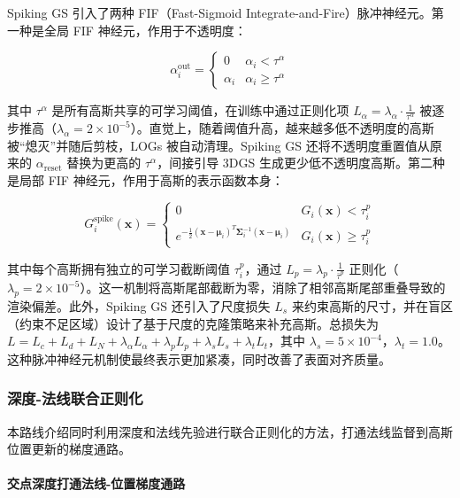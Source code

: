 Spiking GS 引入了两种 FIF（Fast-Sigmoid Integrate-and-Fire）脉冲神经元。第一种是全局 FIF 神经元，作用于不透明度：

\begin{equation}
    \alpha_i^{\text{out}} = \begin{cases} 0 & \alpha_i < \tau^{\alpha} \\ \alpha_i & \alpha_i \geq \tau^{\alpha} \end{cases}
\end{equation}

其中 $\tau^{\alpha}$ 是所有高斯共享的可学习阈值，在训练中通过正则化项 $L_{\alpha} = \lambda_{\alpha} \cdot \frac{1}{\tau^{\alpha}}$ 被逐步推高（$\lambda_{\alpha} = 2 \times 10^{-5}$）。直觉上，随着阈值升高，越来越多低不透明度的高斯被“熄灭”并随后剪枝，LOGs 被自动清理。Spiking GS 还将不透明度重置值从原来的 $\alpha_{\text{reset}}$ 替换为更高的 $\tau^{\alpha}$，间接引导 3DGS 生成更少低不透明度高斯。第二种是局部 FIF 神经元，作用于高斯的表示函数本身：

\begin{equation}
    G_i^{\text{spike}}(\mathbf{x}) = \begin{cases} 0 & G_i(\mathbf{x}) < \tau_i^p \\ e^{-\frac{1}{2}(\mathbf{x}-\boldsymbol{\mu}_i)^T \boldsymbol{\Sigma}_i^{-1}(\mathbf{x}-\boldsymbol{\mu}_i)} & G_i(\mathbf{x}) \geq \tau_i^p \end{cases}
\end{equation}

其中每个高斯拥有独立的可学习截断阈值 $\tau_i^p$，通过 $L_p = \lambda_p \cdot \frac{1}{\bar{\tau}^p}$ 正则化（$\lambda_p = 2 \times 10^{-5}$）。这一机制将高斯尾部截断为零，消除了相邻高斯尾部重叠导致的渲染偏差。此外，Spiking GS 还引入了尺度损失 $L_s$ 来约束高斯的尺寸，并在盲区（约束不足区域）设计了基于尺度的克隆策略来补充高斯。总损失为 $L = L_c + L_d + L_N + \lambda_{\alpha} L_{\alpha} + \lambda_p L_p + \lambda_s L_s + \lambda_t L_t$，其中 $\lambda_s = 5 \times 10^{-4}$，$\lambda_t = 1.0$。这种脉冲神经元机制使最终表示更加紧凑，同时改善了表面对齐质量。

\subsubsection{深度-法线联合正则化}
\label{subsec:04_1_4}

本路线介绍同时利用深度和法线先验进行联合正则化的方法，打通法线监督到高斯位置更新的梯度通路。

\paragraph{交点深度打通法线-位置梯度通路}

